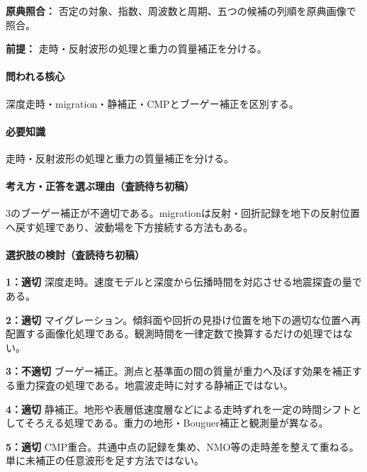 \noindent\textbf{原典照合：} 否定の対象、指数、周波数と周期、五つの候補の列順を原典画像で照合。\par

\noindent\textbf{前提：} 走時・反射波形の処理と重力の質量補正を分ける。\par

\paragraph{問われる核心} 深度走時・migration・静補正・CMPとブーゲー補正を区別する。

\paragraph{必要知識} 走時・反射波形の処理と重力の質量補正を分ける。

\paragraph{考え方・正答を選ぶ理由（査読待ち初稿）} 3のブーゲー補正が不適切である。migrationは反射・回折記録を地下の反射位置へ戻す処理であり、波動場を下方接続する方法もある。

\paragraph{選択肢の検討（査読待ち初稿）}\mbox{}\par

\noindent\textbf{1：適切} 深度走時。速度モデルと深度から伝播時間を対応させる地震探査の量である。\par

\noindent\textbf{2：適切} マイグレーション。傾斜面や回折の見掛け位置を地下の適切な位置へ再配置する画像化処理である。観測時間を一律定数で換算するだけの処理ではない。\par

\noindent\textbf{3：不適切} ブーゲー補正。測点と基準面の間の質量が重力へ及ぼす効果を補正する重力探査の処理である。地震波走時に対する静補正ではない。\par

\noindent\textbf{4：適切} 静補正。地形や表層低速度層などによる走時ずれを一定の時間シフトとしてそろえる処理である。重力の地形・Bouguer補正と観測量が異なる。\par

\noindent\textbf{5：適切} CMP重合。共通中点の記録を集め、NMO等の走時差を整えて重ねる。単に未補正の任意波形を足す方法ではない。\par

